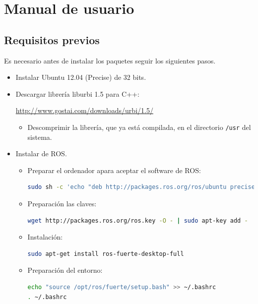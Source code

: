 \documentclass[12pt,a4paper,final,twoside]{book}
\begin{document}
\label{Referencies}
%

\appendix
\clearpage %
\addappheadtotoc
\appendixpage

\section{Manual de usuario}
\subsection{Requisitos previos}
Es necesario antes de instalar los paquetes seguir los siguientes pasos.
\begin{itemize}
\item Instalar Ubuntu 12.04 (Precise) de 32 bits.

\item Descargar librería liburbi 1.5 para C++:

\url{http://www.gostai.com/downloads/urbi/1.5/}
\begin{itemize}
\item Descomprimir la librería, que ya está compilada, en el directorio \texttt{/usr} del sistema.
\end{itemize}
\item Instalar de ROS. 

\begin{itemize}
\item Preparar el ordenador apara aceptar el software de ROS:


\begin{lstlisting}[language=bash]
  sudo sh -c 'echo "deb http://packages.ros.org/ros/ubuntu precise main" > /etc/apt/sources.list.d/ros-latest.list'
\end{lstlisting}

\item Preparación las claves:
\begin{lstlisting}[language=bash]
	wget http://packages.ros.org/ros.key -O - | sudo apt-key add -
\end{lstlisting}

\item Instalación:
\begin{lstlisting}[language=bash]
	sudo apt-get install ros-fuerte-desktop-full
\end{lstlisting}

\item Preparación del entorno:
\begin{lstlisting}[language=bash]
	echo "source /opt/ros/fuerte/setup.bash" >> ~/.bashrc
. ~/.bashrc
\end{lstlisting}


\end{itemize}
\end{itemize}
\end{document}
